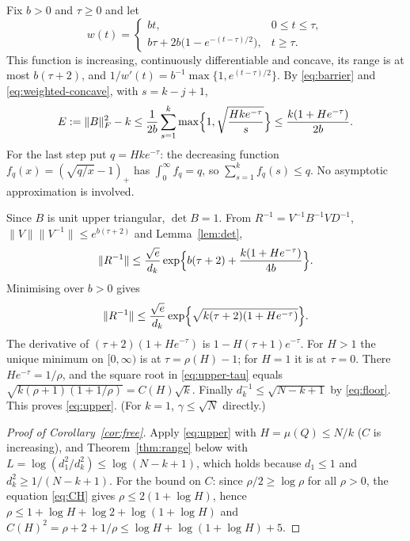 \documentclass[11pt,a4paper]{article}
\theoremstyle{definition}
\numberwithin{equation}{section}
\begin{document}
Fix $b>0$ and $\tau\ge0$ and let
\begin{equation}\label{eq:w}
 w(t)=\begin{cases} bt,&0\le t\le\tau,\\ b\tau+2b\bigl(1-e^{-(t-\tau)/2}\bigr),&t\ge\tau.\end{cases}
\end{equation}
This function is increasing, continuously differentiable and concave, its range is at most $b(\tau+2)$, and
$1/w'(t)=b^{-1}\max\{1,e^{(t-\tau)/2}\}$. By \eqref{eq:barrier} and \eqref{eq:weighted-concave}, with $s=k-j+1$,
\begin{equation}\label{eq:E}
 E:=\|B\|_F^2-k\le\frac1{2b}\sum_{s=1}^k\max\Bigl\{1,\sqrt{\frac{Hke^{-\tau}}s}\Bigr\}\le\frac{k(1+He^{-\tau})}{2b}.
\end{equation}
For the last step put $q=Hke^{-\tau}$: the decreasing function $f_q(x)=(\sqrt{q/x}-1)_+$ has
$\int_0^\infty f_q=q$, so $\sum_{s=1}^kf_q(s)\le q$. No asymptotic approximation is involved.

Since $B$ is unit upper triangular, $\det B=1$. From $R^{-1}=V^{-1}B^{-1}VD^{-1}$, $\|V\|\|V^{-1}\|\le e^{b(\tau+2)}$
and Lemma~\ref{lem:det},
\begin{equation}\label{eq:upper-b}
 \|R^{-1}\|\le\frac{\sqrt e}{d_k}\exp\Bigl\{b(\tau+2)+\frac{k(1+He^{-\tau})}{4b}\Bigr\}.
\end{equation}
Minimising over $b>0$ gives
\begin{equation}\label{eq:upper-tau}
 \|R^{-1}\|\le\frac{\sqrt e}{d_k}\exp\Bigl\{\sqrt{k(\tau+2)(1+He^{-\tau})}\Bigr\}.
\end{equation}
The derivative of $(\tau+2)(1+He^{-\tau})$ is $1-H(\tau+1)e^{-\tau}$. For $H>1$ the unique minimum on $[0,\infty)$ is
at $\tau=\rho(H)-1$; for $H=1$ it is at $\tau=0$. There $He^{-\tau}=1/\rho$, and the square root in
\eqref{eq:upper-tau} equals $\sqrt{k(\rho+1)(1+1/\rho)}=C(H)\sqrt k$. Finally $d_k^{-1}\le\sqrt{N-k+1}$ by
\eqref{eq:floor}. This proves \eqref{eq:upper}. (For $k=1$, $\gamma\le\sqrt N$ directly.)

\begin{proof}[Proof of Corollary~\ref{cor:free}]
Apply \eqref{eq:upper} with $H=\mu(Q)\le N/k$ ($C$ is increasing), and Theorem~\ref{thm:range} below with
$L=\log(d_1^2/d_k^2)\le\log(N-k+1)$, which holds because $d_1\le1$ and $d_k^{2}\ge1/(N-k+1)$. For the bound on $C$:
since $\rho/2\ge\log\rho$ for all $\rho>0$, the equation \eqref{eq:CH} gives $\rho\le2(1+\log H)$, hence
$\rho\le1+\log H+\log2+\log(1+\log H)$ and $C(H)^2=\rho+2+1/\rho\le\log H+\log(1+\log H)+5$.
\end{proof}
\end{document}
